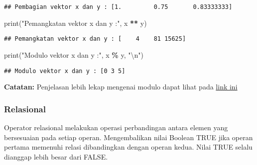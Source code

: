 \documentclass[
]{docs}
\newenvironment{Shaded}{\begin{snugshade}}{\end{snugshade}}
\newcommand{\BuiltInTok}[1]{#1}
\newcommand{\CharTok}[1]{\textcolor[rgb]{0.31,0.60,0.02}{#1}}
\newcommand{\NormalTok}[1]{#1}
\newcommand{\OperatorTok}[1]{\textcolor[rgb]{0.81,0.36,0.00}{\textbf{#1}}}
\newcommand{\StringTok}[1]{\textcolor[rgb]{0.31,0.60,0.02}{#1}}
\begin{document}
\begin{verbatim}
## Pembagian vektor x dan y : [1.         0.75       0.83333333]
\end{verbatim}

\begin{Shaded}
\begin{Highlighting}[]
\BuiltInTok{print}\NormalTok{(}\StringTok{"Pemangkatan vektor x dan y :"}\NormalTok{, x }\OperatorTok{**}\NormalTok{ y) }
\end{Highlighting}
\end{Shaded}

\begin{verbatim}
## Pemangkatan vektor x dan y : [    4    81 15625]
\end{verbatim}

\begin{Shaded}
\begin{Highlighting}[]
\BuiltInTok{print}\NormalTok{(}\StringTok{"Modulo vektor x dan y :"}\NormalTok{, x }\OperatorTok{\%}\NormalTok{ y, }\StringTok{"}\CharTok{\textbackslash{}n}\StringTok{"}\NormalTok{)}
\end{Highlighting}
\end{Shaded}

\begin{verbatim}
## Modulo vektor x dan y : [0 3 5]
\end{verbatim}

\textbf{Catatan:} Penjelasan lebih lekap mengenai modulo dapat lihat pada \href{https://www.omnicalculator.com/math/modulo}{link ini}

\hypertarget{relasional}{%
\subsubsection{Relasional}\label{relasional}}

Operator relasional melakukan operasi perbandingan antara elemen yang bersesuaian pada setiap operan. Mengembalikan nilai Boolean TRUE jika operan pertama memenuhi relasi dibandingkan dengan operan kedua. Nilai TRUE selalu dianggap lebih besar dari FALSE.
\end{document}
